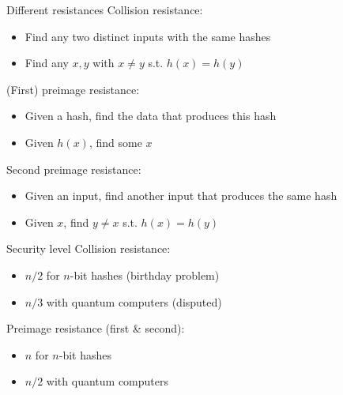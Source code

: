 \begin{frame}{Different resistances}
  Collision resistance:
  \begin{itemize}[<+(1)->]
    \item Find any two distinct inputs with the same hashes
    \item Find any $x, y$ with $x \neq y$ s.t. $h(x) = h(y)$
  \end{itemize}

  \pause
  (First) preimage resistance:
  \begin{itemize}[<+(1)->]
    \item Given a hash, find the data that produces this hash
    \item Given $h(x)$, find some $x$
  \end{itemize}

  \pause
  Second preimage resistance:
  \begin{itemize}[<+(1)->]
    \item Given an input, find another input that produces the same hash
    \item Given $x$, find $y \neq x$ s.t. $h(x) = h(y)$
  \end{itemize}
\end{frame}

\begin{frame}{Security level}
  Collision resistance:
  \begin{itemize}[<+(1)->]
    \item $n/2$ for $n$-bit hashes (birthday problem)
    \item $n/3$ with quantum computers (disputed)
  \end{itemize}

  \vspace*{1em}

  \pause
  Preimage resistance (first \& second):
  \begin{itemize}[<+(1)->]
    \item $n$ for $n$-bit hashes
    \item $n/2$ with quantum computers
  \end{itemize}
\end{frame}

